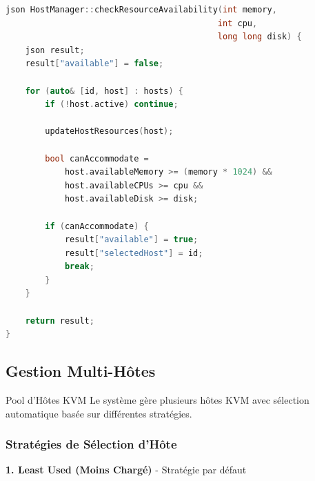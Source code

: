 \documentclass[12pt,a4paper]{article}
\begin{document}
\begin{lstlisting}[language=C++, caption=Vérification de disponibilité]
json HostManager::checkResourceAvailability(int memory, 
                                           int cpu, 
                                           long long disk) {
    json result;
    result["available"] = false;
    
    for (auto& [id, host] : hosts) {
        if (!host.active) continue;
        
        updateHostResources(host);
        
        bool canAccommodate = 
            host.availableMemory >= (memory * 1024) &&
            host.availableCPUs >= cpu &&
            host.availableDisk >= disk;
        
        if (canAccommodate) {
            result["available"] = true;
            result["selectedHost"] = id;
            break;
        }
    }
    
    return result;
}
\end{lstlisting}

\subsection{Gestion Multi-Hôtes}

\begin{successbox}{Pool d'Hôtes KVM}
Le système gère plusieurs hôtes KVM avec sélection automatique basée sur différentes stratégies.
\end{successbox}

\subsubsection{Stratégies de Sélection d'Hôte}

\textbf{1. Least Used (Moins Chargé)} - Stratégie par défaut
\end{document}
